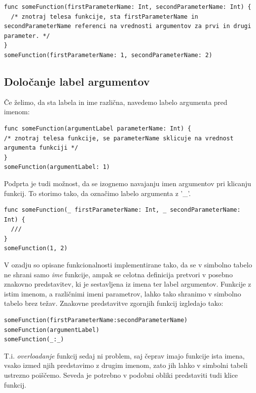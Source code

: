 \documentclass[a4paper, 12p]{book}
\begin{document}
\begin{lstlisting}[caption={Primer definicije in klica funkcije.}, captionpos=b]
func someFunction(firstParameterName: Int, secondParameterName: Int) {
  /* znotraj telesa funkcije, sta firstParameterName in secondParameterName referenci na vrednosti argumentov za prvi in drugi parameter. */
}
someFunction(firstParameterName: 1, secondParameterName: 2)
\end{lstlisting}

\subsection{Določanje label argumentov}

Če želimo, da sta labela in ime različna, navedemo labelo argumenta pred imenom:

\begin{lstlisting}[caption={Labela argumenta in ime parametra se razlikujeta.}, captionpos=b]
func someFunction(argumentLabel parameterName: Int) {
/* znotraj telesa funkcije, se parameterName sklicuje na vrednost argumenta funkciji */
}
someFunction(argumentLabel: 1) 
\end{lstlisting}

Podprta je tudi možnost, da se izognemo navajanju imen argumentov pri klicanju funkcij. To storimo tako, da označimo labelo argumenta z '\_'.

\begin{lstlisting}[caption={}, captionpos=b]
func someFunction(_ firstParameterName: Int, _ secondParameterName: Int) {
  ///
}
someFunction(1, 2)
\end{lstlisting}

V ozadju so opisane funkcionalnosti implementirane tako, da se v simbolno tabelo ne shrani samo \textit{ime} funkcije, ampak se celotna definicija pretvori v posebno znakovno predstavitev, ki je sestavljena iz imena ter label argumentov. Funkcije z istim imenom, a različnimi imeni parametrov, lahko tako shranimo v simbolno tabelo brez težav. Znakovne predstavitve zgornjih funkcij izgledajo tako:

\begin{lstlisting}[caption={Znakovne predstavitve funkcij.}, captionpos=b]
someFunction(firstParameterName:secondParameterName)
someFunction(argumentLabel)
someFunction(_:_)
\end{lstlisting}

T.i. \textit{overloadanje} funkcij sedaj ni problem, saj čeprav imajo funkcije ista imena, vsako izmed njih predstavimo z drugim imenom, zato jih lahko v simbolni tabeli ustrezno poiščemo. Seveda je potrebno v podobni obliki predstaviti tudi klice funkcij.
\end{document}
